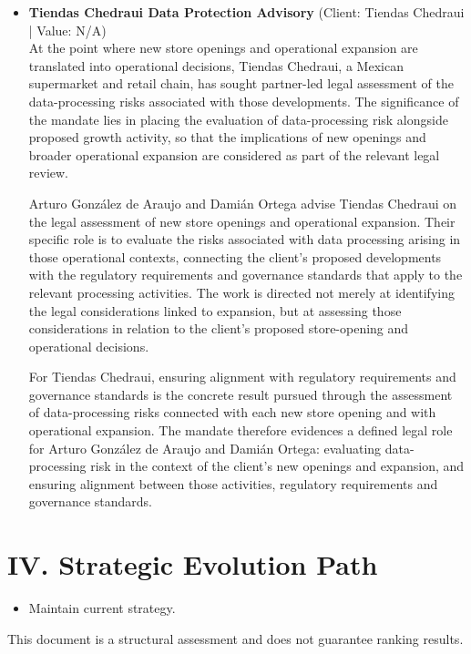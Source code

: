 \documentclass[11pt]{article}
\begin{document}
\begin{itemize}
Arturo González de Araujo, Ernesto Zavala and Damián Ortega led the mandate. Their work connected the implementation of the data protection framework to Grupo Modelquipo’s corporate governance strategy, with risk management and compliance forming the central focus of the engagement. The stated result was improved regulatory compliance and the integration of data protection into governance culture, achieved through the implementation of the data protection framework as part of the client’s corporate governance strategy.
\item \textbf{Tiendas Chedraui Data Protection Advisory} (Client: Tiendas Chedraui | Value: N/A)\\ At the point where new store openings and operational expansion are translated into operational decisions, Tiendas Chedraui, a Mexican supermarket and retail chain, has sought partner-led legal assessment of the data-processing risks associated with those developments. The significance of the mandate lies in placing the evaluation of data-processing risk alongside proposed growth activity, so that the implications of new openings and broader operational expansion are considered as part of the relevant legal review.

Arturo González de Araujo and Damián Ortega advise Tiendas Chedraui on the legal assessment of new store openings and operational expansion. Their specific role is to evaluate the risks associated with data processing arising in those operational contexts, connecting the client’s proposed developments with the regulatory requirements and governance standards that apply to the relevant processing activities. The work is directed not merely at identifying the legal considerations linked to expansion, but at assessing those considerations in relation to the client’s proposed store-opening and operational decisions.

For Tiendas Chedraui, ensuring alignment with regulatory requirements and governance standards is the concrete result pursued through the assessment of data-processing risks connected with each new store opening and with operational expansion. The mandate therefore evidences a defined legal role for Arturo González de Araujo and Damián Ortega: evaluating data-processing risk in the context of the client’s new openings and expansion, and ensuring alignment between those activities, regulatory requirements and governance standards.

\end{itemize}

\section*{IV. Strategic Evolution Path}
\begin{itemize}
\item Maintain current strategy.
\end{itemize}

\vfill
\centering
\small{This document is a structural assessment and does not guarantee ranking results.}
\end{document}
